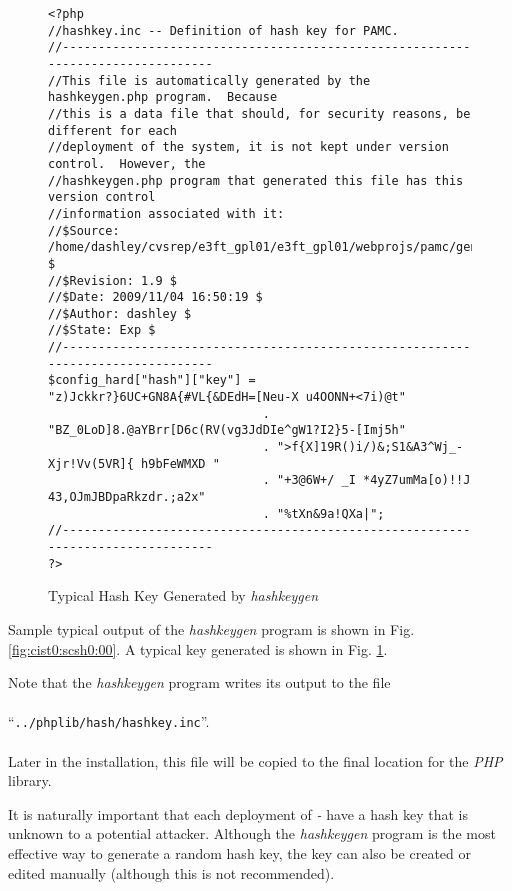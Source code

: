 \begin{figure}
\begin{scriptsize}
\begin{verbatim}
<?php
//hashkey.inc -- Definition of hash key for PAMC.
//--------------------------------------------------------------------------------
//This file is automatically generated by the hashkeygen.php program.  Because
//this is a data file that should, for security reasons, be different for each
//deployment of the system, it is not kept under version control.  However, the
//hashkeygen.php program that generated this file has this version control
//information associated with it:
//$Source: /home/dashley/cvsrep/e3ft_gpl01/e3ft_gpl01/webprojs/pamc/gen_a/docs/manual/man_a/c_ist0/c_ist0.tex,v $
//$Revision: 1.9 $
//$Date: 2009/11/04 16:50:19 $
//$Author: dashley $
//$State: Exp $
//--------------------------------------------------------------------------------
$config_hard["hash"]["key"] =   "z)Jckkr?}6UC+GN8A{#VL{&DEdH=[Neu-X u4OONN+<7i)@t"
                              . "BZ_0LoD]8.@aYBrr[D6c(RV(vg3JdDIe^gW1?I2}5-[Imj5h"
                              . ">f{X]19R()i/)&;S1&A3^Wj_-Xjr!Vv(5VR]{ h9bFeWMXD "
                              . "+3@6W+/ _I *4yZ7umMa[o)!!J 43,OJmJBDpaRkzdr.;a2x"
                              . "%tXn&9a!QXa|";
//--------------------------------------------------------------------------------
?>
\end{verbatim}
\end{scriptsize}
\caption{Typical Hash Key Generated by \emph{hashkeygen}}
\label{fig:cist0:scsh0:01}
\end{figure}

Sample typical output of the \emph{hashkeygen} program is shown in
Fig. \ref{fig:cist0:scsh0:00}.  A typical key
generated is shown in 
Fig. \ref{fig:cist0:scsh0:01}.

Note that the \emph{hashkeygen} program writes its output to the file\\\\
``\texttt{../phplib/hash/hashkey.inc}''.\\\\  Later in the installation,
this file will be copied to the final location for the \emph{PHP} library.

It is naturally important that each deployment of
\emph{\productbasename{}-\productversion{}} have a hash key that is
unknown to a potential attacker.  Although the \emph{hashkeygen} program is 
the most effective way to generate a random hash key, the key can also
be created or edited manually (although this is not recommended).


